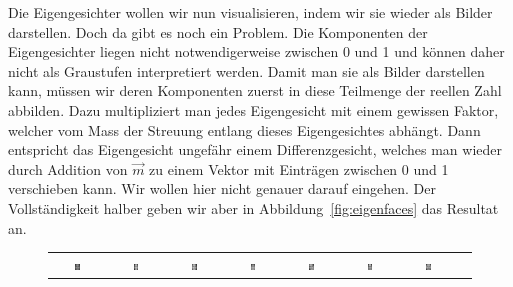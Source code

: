 Die Eigengesichter wollen wir nun visualisieren, indem wir sie wieder als Bilder darstellen.
Doch da gibt es noch ein Problem.
Die Komponenten der Eigengesichter liegen nicht notwendigerweise zwischen 0 und 1 und können daher nicht als Graustufen interpretiert werden.
Damit man sie als Bilder darstellen kann, müssen wir deren Komponenten zuerst in diese Teilmenge der reellen Zahl abbilden.
Dazu multipliziert man jedes Eigengesicht mit einem gewissen Faktor, welcher vom Mass der Streuung entlang dieses Eigengesichtes abhängt.
Dann entspricht das Eigengesicht ungefähr einem Differenzgesicht, welches man wieder durch Addition von $\vec m$ zu einem Vektor mit Einträgen zwischen 0 und 1 verschieben kann.
Wir wollen hier nicht genauer darauf eingehen.
Der Vollständigkeit halber geben wir aber in Abbildung~\ref{fig:eigenfaces} das Resultat an.
\begin{figure}[ht]
	\begin{tabular}{cccccccc}
		\includegraphics[width=0.1\textwidth]{images/eigenfaces/eigenface00} & \includegraphics[width=0.1\textwidth]{images/eigenfaces/eigenface01} &
		\includegraphics[width=0.1\textwidth]{images/eigenfaces/eigenface02} & \includegraphics[width=0.1\textwidth]{images/eigenfaces/eigenface03} &
		\includegraphics[width=0.1\textwidth]{images/eigenfaces/eigenface04} &
		\includegraphics[width=0.1\textwidth]{images/eigenfaces/eigenface05} & \includegraphics[width=0.1\textwidth]{images/eigenfaces/eigenface06} &

\end{tabular}
\end{figure}
